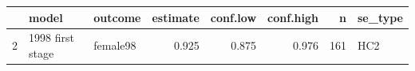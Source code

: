 
\begin{tabular}{lllrrrrl}
\toprule
  & model & outcome & estimate & conf.low & conf.high & n & se\_type\\
\midrule
2 & 1998 first stage & female98 & 0.925 & 0.875 & 0.976 & 161 & HC2\\
\bottomrule
\end{tabular}

